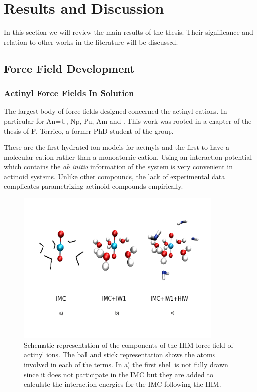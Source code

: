 \chapter[Results and Discussion]{Results and Discussion}
In this section we will review the main results of the thesis. Their significance and relation to 
other works in the literature will be discussed.

\section[Force Fields Development]{Force Field Development}\label{ffdevelopment}
\subsection[Actinyl Force Fields In Solution]{Actinyl Force Fields In Solution}
The largest body of force fields designed concerned the actinyl cations. In particular 
 for An=U, Np, Pu, Am and \ce{[NpO2*(H2O)5]^{+}}. This work was 
rooted in a chapter of the thesis of F. Torrico, a former PhD student of the group\cite{thesisFran}.

These are the first hydrated ion models for actinyls and 
the first to have a molecular cation rather than a monoatomic cation. Using an interaction 
potential which contains the \textit{ab initio} information of the system is very convenient in 
actinoid systems. Unlike other compounds, the lack of experimental data complicates parametrizing
actinoid compounds empirically\cite{Ions_in_sol_and_Marcus_2016}. 

\begin{figure}
\centering 
\includegraphics[width=10cm]{./images/IMCIW1HIW.png}
\caption[Components of the Hydrated Ion Model]{Schematic representation of the components of 
the HIM force field of actinyl ions. The 
ball and stick representation shows the atoms involved in each of the terms. In a) the first shell 
is not fully 
drawn since it does not participate in the IMC but they are added to calculate the interaction 
energies for the IMC following the HIM. }\label{HIM_actinyl}
\end{figure}


